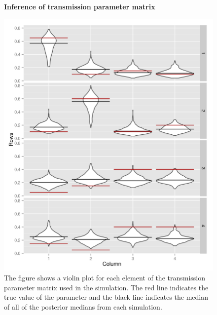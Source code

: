 \documentclass[11pt,a4paper]{report}
\begin{document}
\begin{figure}[h!]
\centering
{\bf Inference of transmission parameter matrix}
\caption{The figure shows a violin plot for each element of the transmission parameter matrix used in the simulation. The red line indicates the true value of the parameter and the black line indicates the median of all of the posterior medians from each simulation.}
\includegraphics[scale=0.6]{violinmat.png}
\end{figure}
\end{document}
